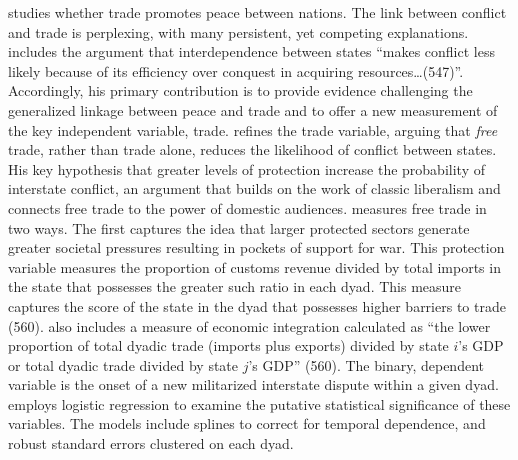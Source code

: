 \citet{mcdonald:2004} studies whether trade promotes peace between nations. The link between conflict and trade is perplexing, with many persistent, yet competing explanations. \citet{mcdonald:2004} includes the argument that interdependence between states ``makes conflict less likely because of its efficiency over conquest in acquiring resources\ldots (547)''. Accordingly, his primary contribution is to provide evidence challenging the generalized linkage between peace and trade and to offer a new measurement of the key independent variable, trade. \citet{mcdonald:2004} refines the trade variable, arguing that \textit{free} trade, rather than trade alone, reduces the likelihood of conflict between states. His key hypothesis that greater levels of protection increase the probability of interstate conflict, an argument that builds on the work of classic liberalism and connects free trade to the power of domestic audiences. \citet{mcdonald:2004} measures free trade in two ways. The first captures the idea that larger protected sectors generate greater societal pressures resulting in pockets of support for war. This protection variable measures the proportion of customs revenue divided by total imports in the state that possesses the greater such ratio in each dyad. This measure captures the score of the state in the dyad that possesses higher barriers to trade (560). \citet{mcdonald:2004} also includes a measure of economic integration  calculated as ``the lower proportion of total dyadic trade (imports plus exports) divided by state $i$'s GDP or total dyadic trade divided by state $j$'s GDP'' (560). The binary, dependent variable is the onset of a new militarized interstate dispute within a given dyad. \citet{mcdonald:2004} employs logistic regression to examine the putative statistical significance of these variables. The models include splines to correct for temporal dependence, and robust standard errors clustered on each dyad.


